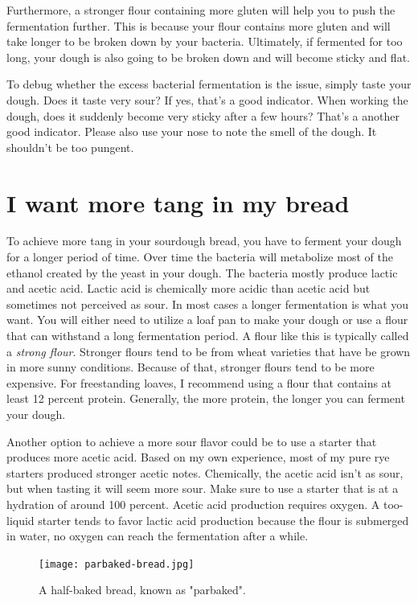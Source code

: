 Furthermore, a stronger flour containing more gluten
will help you to push the fermentation further. This
is because your flour contains more gluten and will
take longer to be broken down by your bacteria. Ultimately,
if fermented for too long, your dough is also going
to be broken down and will become sticky and flat.

To debug whether the excess bacterial fermentation is the issue,
simply taste your dough. Does it taste very sour? If yes,
that's a good indicator. When working the dough, does it
suddenly become very sticky after a few hours? That's a
another good indicator. Please also use your nose to note
the smell of the dough. It shouldn't be too pungent.

\section{I want more tang in my bread}

To achieve more tang in your sourdough bread, you have
to ferment your dough for a longer period of time.
Over time the bacteria will metabolize most of the
ethanol created by the yeast in your dough. The bacteria
mostly produce lactic and acetic acid. Lactic acid
is chemically more acidic than acetic acid but sometimes
not perceived as sour. In most cases a longer fermentation
is what you want. You will either need to utilize a loaf
pan to make your dough or use a flour that can withstand
a long fermentation period. A flour like this is typically
called a {\it strong flour}. Stronger flours tend
to be from wheat varieties that have be grown in more
sunny conditions. Because of that, stronger flours tend
to be more expensive. For freestanding loaves, I recommend
using a flour that contains at least 12 percent protein.
Generally, the more protein, the longer you can ferment your dough.

Another option to achieve a more sour flavor could be to
use a starter that produces more acetic acid. Based on my own
experience, most of my pure rye starters produced stronger acetic
notes. Chemically, the acetic acid isn't as sour, but when tasting
it will seem more sour. Make sure to use a starter that is at
a hydration of around 100 percent. Acetic acid production
requires oxygen. A too-liquid starter tends to favor lactic
acid production because the flour is submerged in water, no
oxygen can reach the fermentation after a while.

\begin{figure}[!htb]
  \texttt{[image: parbaked-bread.jpg]}
  \caption{A half-baked bread, known as "parbaked".}
  \label{fig:parbaked-bread}
\end{figure}

